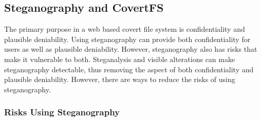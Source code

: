 \subsection{Steganography and CovertFS}


The primary purpose in a web based covert file system is confidentiality and plausible deniability. Using steganography can provide both confidentiality for users as well as plausible deniability. However, steganography also has risks that make it vulnerable to both. Steganalysis and visible alterations\cite{PierreRicher2003} can make steganography detectable, thus removing the aspect of both confidentiality and plausible deniability. However, there are ways to reduce the risks of using steganography. 

\subsubsection{Risks Using Steganography}

